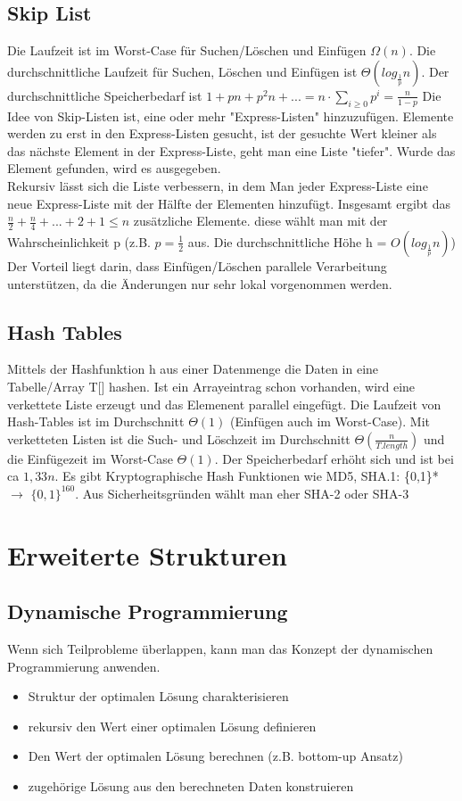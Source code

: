 \documentclass[jou,apacite]{apa6}
\begin{document}
\subsection{Skip List}
Die Laufzeit ist im Worst-Case für Suchen/Löschen und Einfügen $\Omega(n)$. Die durchschnittliche Laufzeit für Suchen, Löschen und Einfügen ist $\Theta(log_{\frac{1}{p}}n)$. Der durchschnittliche Speicherbedarf ist $1 + pn + p^2n + ... = n \cdot \sum_{i\ge0}p^i = \frac{n}{1-p}$ Die Idee von Skip-Listen ist, eine oder mehr "Express-Listen" hinzuzufügen. Elemente werden zu erst in den Express-Listen gesucht, ist der gesuchte Wert kleiner als das nächste Element in der Express-Liste, geht man eine Liste "tiefer". Wurde das Element gefunden, wird es ausgegeben. \\
Rekursiv lässt sich die Liste verbessern, in dem Man jeder Express-Liste eine neue Express-Liste mit der Hälfte der Elementen hinzufügt. Insgesamt ergibt das $\frac{n}{2} + \frac{n}{4} + ... + 2 + 1 \le n$ zusätzliche Elemente. diese wählt man mit der Wahrscheinlichkeit p (z.B. $p=\frac{1}{2}$ aus. Die durchschnittliche Höhe h = $O(log_{\frac{1}{p}}n)$)\\
Der Vorteil liegt darin, dass Einfügen/Löschen parallele Verarbeitung unterstützen, da die Änderungen nur sehr lokal vorgenommen werden.



\subsection{Hash Tables}
Mittels der Hashfunktion h aus einer Datenmenge die Daten in eine Tabelle/Array T[] hashen. Ist ein Arrayeintrag schon vorhanden, wird eine verkettete Liste erzeugt und das Elemenent parallel eingefügt. Die Laufzeit von Hash-Tables ist im Durchschnitt $\Theta(1)$ (Einfügen auch im Worst-Case). Mit verketteten Listen ist die Such- und Löschzeit im Durchschnitt $\Theta(\frac{n}{T.length})$ und die Einfügezeit im Worst-Case $\Theta(1)$. Der Speicherbedarf erhöht sich und ist bei ca $1,33n$. Es gibt Kryptographische Hash Funktionen wie MD5, SHA.1: \{0,1\}* $\rightarrow$ $\{0,1\}^{160}$. Aus Sicherheitsgründen wählt man eher SHA-2 oder SHA-3



\section{Erweiterte Strukturen}
\subsection{Dynamische Programmierung}
Wenn sich Teilprobleme überlappen, kann man das Konzept der dynamischen Programmierung anwenden. 
\begin{itemize}
    \item Struktur der optimalen Lösung charakterisieren
    \item rekursiv den Wert einer optimalen Lösung definieren
    \item Den Wert der optimalen Lösung berechnen (z.B. bottom-up Ansatz)
    \item zugehörige Lösung aus den berechneten Daten konstruieren
\end{itemize}
\end{document}
